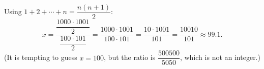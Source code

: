Using $1+2+\cdots+n=\dfrac{n(n+1)}{2}$:
\[
x=\dfrac{\dfrac{1000\cdot1001}{2}}{\dfrac{100\cdot101}{2}}=\dfrac{1000\cdot1001}{100\cdot101}=\dfrac{10\cdot1001}{101}=\boxed{\dfrac{10010}{101}}\approx99.1 .
\]
(It is tempting to guess $x=100$, but the ratio is $\dfrac{500500}{5050}$, which is not an integer.)
